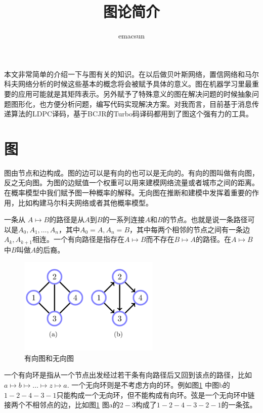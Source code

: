 \documentclass[10pt,a4paper,UTF8]{article}
\author{emacsun}
\date{}
\title{图论简介}
\begin{document}
\maketitle
\tableofcontents

本文非常简单的介绍一下与图有关的知识。在以后做贝叶斯网络，置信网络和马尔科夫网络分析的时候这些基本的概念将会被赋予具体的意义。图在机器学习里最重要的应用可能就是其矩阵表示。另外赋予了特殊意义的图在解决问题的时候抽象问题图形化，也方便分析问题，编写代码实现解决方案。对我而言，目前基于消息传递算法的LDPC译码，基于BCJR的Turbo码译码都用到了图这个强有力的工具。

\section{图}
\label{sec:org6f1bce8}


图由节点和边构成。图的边可以是有向的也可以是无向的。有向的图叫做有向图，反之无向图。为图的边赋值一个权重可以用来建模网络流量或者城市之间的距离。在概率模型中我们赋予图一种概率的解释。无向图在推断和建模中发挥着重要的作用，比如构建马尔科夫网络或者其他概率模型。

\begin{definition}
一条从 \(A \mapsto B\)的路径是从\(A\)到\(B\)的一系列连接\(A\)和\(B\)的节点。也就是说一条路径可以是\(A_{0},A_{1},\ldots ,A_{n}\)，其中\(A_{0}=A,A_{n}= B\)，其中每两个相邻的节点之间有一条边\(A_{k},A_{k+1}\)相连。一个有向路径是指存在\(A\mapsto B\)而不存在\(B\mapsto A\)的路径。在\(A\mapsto B\)中\(B\)叫做\(A\)的后裔。
\end{definition}
\begin{figure}[htbp]
\centering
\includegraphics[width=0.6\textwidth]{../../img/20170315fig2dot2.png}
\caption{\label{fig:orga43b8b4}
有向图和无向图}
\end{figure}

\begin{definition}
一个有向环是指从一个节点出发经过若干条有向路径后又回到该点的路径，比如\(a\mapsto b\mapsto \ldots \mapsto z \mapsto a\). 一个无向环则是不考虑方向的环。例如图\ref{fig:orga43b8b4} 中图b的\(1-2-4-3-1\)只能构成一个无向环，但不能构成有向环。弦是一个无向环中链接两个不相邻点的边，比如图\ref{fig:orga43b8b4} 图a的\(2-3\)构成了\(1-2-4-3-2-1\)的一条弦。
\end{definition}
\end{document}
